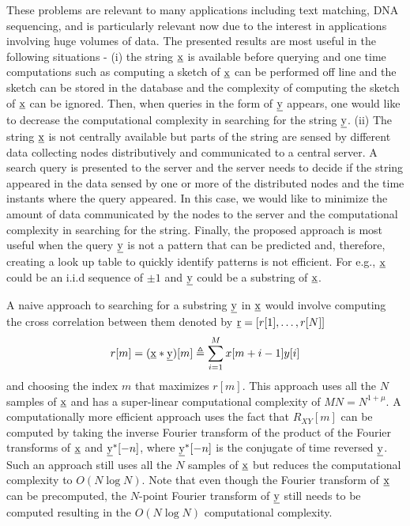 These problems are relevant to many applications including text matching, DNA sequencing, and is particularly relevant now due to the interest in applications involving huge volumes of data. The presented results are most useful in the following situations - (i) the string $\underline{\mathrm{x}}$ is available before querying and one time computations such as computing a sketch of $\underline{\mathrm{x}}$ can be performed off line and the sketch can be stored in the database and the complexity of computing the sketch of $\underline{\mathrm{x}}$ can be ignored. Then, when queries in the form of $\underline{\mathrm{y}}$ appears, one would like to decrease the computational complexity in searching for the string $\underline{\mathrm{y}}$. (ii) The string $\underline{\mathrm{x}}$ is not centrally available but parts of the string are sensed by different data collecting nodes distributively and communicated to a central server. A search query is presented to the server and the server needs to decide if the string appeared in the data sensed by one or more of the distributed nodes and the time instants where the query appeared. In this case, we would like to minimize the amount of data communicated by the nodes to the server and the computational complexity in searching for the string.
Finally, the proposed approach is most useful when the query $\underline{\mathrm{y}}$ is not a pattern that can be predicted and, therefore, creating a look up table to quickly identify patterns is not efficient. For e.g., $\underline{\mathrm{x}}$ could be an i.i.d sequence of $\pm 1$ and $\underline{\mathrm{y}}$ could be a substring of $\underline{\mathrm{x}}$.

A naive approach to searching for a substring $\underline{\mathrm{y}}$ in $\underline{\mathrm{x}}$ would involve computing the cross correlation between them denoted by  $\underline{\mathrm{r}}=[r[1],\ldots,r[N]]$
\begin{align}
\label{Eqn:DefCrossCorrelation}
r[m]=(\underline{\mathrm{x}}*\underline{\mathrm{y}})[m] \triangleq \sum_{i=1}^{M} x[m+i-1] y[i]
\end{align} 
and choosing the index $m$ that maximizes $r[m]$. This approach uses all the $N$ samples of $\underline{\mathrm{x}}$ and has a super-linear computational complexity of $MN = N^{1+\mu}$. A computationally more efficient approach uses the fact that $R_{XY}[m]$ can be computed by taking the inverse Fourier transform of the product of the Fourier transforms of $\underline{\mathrm{x}}$ and $ \underline{\mathrm{y}}^*[-n]$, where $\underline{\mathrm{y}}^*[-n]$ is the conjugate of time reversed $\underline{\mathrm{y}}$. Such an approach still uses all the $N$ samples of $\underline{\mathrm{x}}$ but reduces the computational complexity to $O(N \log N)$. Note that even though the Fourier transform of $\underline{\mathrm{x}}$ can be precomputed, the $N$-point Fourier transform of $\underline{\mathrm{y}}$ still needs to be computed resulting in the $O(N \log N)$ computational complexity.

